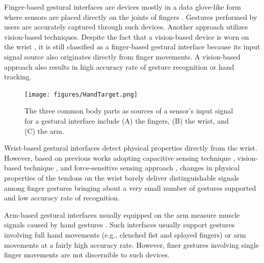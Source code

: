 \documentclass{sigchi}
\begin{document}
Finger-based gestural interfaces are devices mostly in a data glove-like form where sensors are placed directly on the joints of fingers \cite{4539650}. Gestures performed by users are accurately captured through such devices.
Another approach utilizes vision-based techniques. Despite the fact that a vision-based device is worn on the wrist \cite{Kim:2012:DFI:2380116.2380139}, it is still classified as a finger-based gestural interface because its input signal source also originates directly from finger movements. A vision-based approach also results in high accuracy rate of gesture recognition or hand tracking.

\begin{figure}
  \begin{center}
  \texttt{[image: figures/HandTarget.png]}
  \caption{The three common body parts as sources of a sensor's input signal for a gestural interface include (A) the fingers, (B) the wrist, and (C) the arm.}
  \label{fig:HandTarget}
  \end{center}
\end{figure}

Wrist-based gestural interfaces detect physical properties directly from the wrist.
However, based on previous works adopting capacitive sensing technique \cite{Rekimoto:2001:GGU:580581.856565}, vision-based technique \cite{Dementyev:2014:WLG:2642918.2647396}, and force-sensitive sensing approach \cite{Fukui:2011:HSC:2030112.2030154}, changes in physical properties of the tendons on the wrist barely deliver distinguishable signals among finger gestures bringing about a very small number of gestures supported and low accuracy rate of recognition.


Arm-based gestural interfaces usually equipped on the arm measure muscle signals caused by hand gestures \cite{Myo} \cite{Saponas:2009:EAI:1622176.1622208}. Such interfaces usually support gestures involving full hand movements (e.g., clenched fist and splayed fingers) or arm movements at a fairly high accuracy rate. However, finer gestures involving single finger movements are not discernible to such devices.
\end{document}
